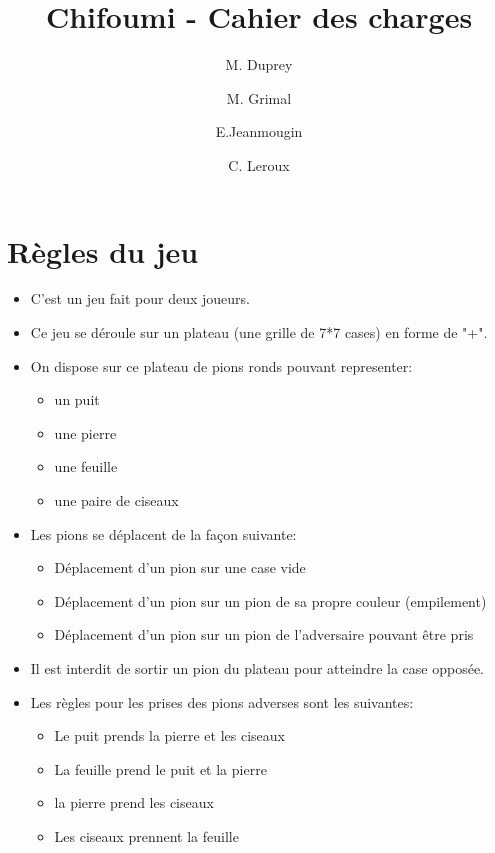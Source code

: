 \documentclass[12pt]{article}
\begin{document}
 
\title{Chifoumi - Cahier des charges}
\author{M. Duprey \and M. Grimal \and E.Jeanmougin \and C. Leroux}
 
 
 \maketitle
 
 \newpage
 \tableofcontents
\newpage

\section{Règles du jeu}

\begin{itemize}

 \item C'est un jeu fait pour deux joueurs.
 \item Ce jeu se déroule sur un plateau (une grille de 7*7 cases) en forme de "+".
 \item On dispose sur ce plateau de pions ronds pouvant representer:
 \begin{itemize}
    \item[\textbullet] un puit
    \item[\textbullet] une pierre
    \item[\textbullet] une feuille
    \item[\textbullet] une paire de ciseaux
 \end{itemize}
\item Les pions se déplacent de la façon suivante:
\begin{itemize}
  \item[\textbullet]Déplacement d'un pion sur une case vide
  \item[\textbullet]Déplacement d'un pion sur un pion de sa propre couleur (empilement)
  \item[\textbullet]Déplacement d'un pion sur un pion de l'adversaire pouvant être pris
\end{itemize}
  \item Il est interdit de sortir un pion du plateau pour atteindre la case opposée.
  \item Les règles pour les prises des pions adverses sont les suivantes:
\begin{itemize}
  \item[\textbullet]Le puit prends la pierre et les ciseaux
  \item[\textbullet]La feuille prend le puit et la pierre
  \item[\textbullet]la pierre prend les ciseaux
  \item[\textbullet]Les ciseaux prennent la feuille
\end{itemize}


\end{itemize}
\end{document}
